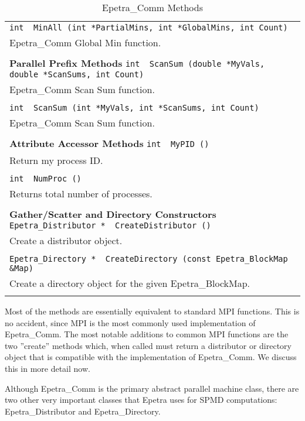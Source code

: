 \documentclass[12pt,relax]{EpetraUserGuide}
\newcommand{\comm}{Epetra\_Comm}
\newcommand{\blockmap}{Epetra\_BlockMap}
\newcommand{\distributor}{Epetra\_Distributor}
\newcommand{\directory}{Epetra\_Directory}
\begin{document}
\begin{table}
\begin{center}
\begin{tabular}{ | p{15cm} | }
 \\
\verb!int  MinAll (int *PartialMins, int *GlobalMins, int Count)!\\
  \comm{} Global Min function. \\
 \\
{\bf Parallel Prefix Methods }
\verb!int  ScanSum (double *MyVals, double *ScanSums, int Count)!\\
  \comm{} Scan Sum function. \\
 \\
\verb!int  ScanSum (int *MyVals, int *ScanSums, int Count)!\\
  \comm{} Scan Sum function. \\
 \\
{\bf Attribute Accessor Methods} 
\verb!int  MyPID ()!\\
  Return my process ID. \\
 \\
\verb!int  NumProc ()!\\
  Returns total number of processes. \\
 \\
{\bf Gather/Scatter and Directory Constructors }
\verb!Epetra_Distributor *  CreateDistributor ()!\\
  Create a distributor object. \\
 \\
\verb!Epetra_Directory *  CreateDirectory (const Epetra_BlockMap &Map)!\\
  Create a directory object for the given \blockmap{}. \\
 \\
\hline
\end{tabular}
\caption{\comm{} Methods}
\label{Table:CommMethods}
\end{center}
\end{table}
Most of the methods are essentially equivalent to standard MPI functions.  
This is no accident, since MPI is the most commonly used implementation of
\comm{}.  The most notable additions to common MPI functions are the two 
''create'' methods which, when called must return a distributor or directory
object that is compatible with the implementation of \comm{}.  We discuss this
in more detail now.

Although \comm{} is the primary abstract parallel machine class, there are two
other very important classes that Epetra uses for SPMD computations: 
\distributor{} and \directory{}.  
\end{document}
